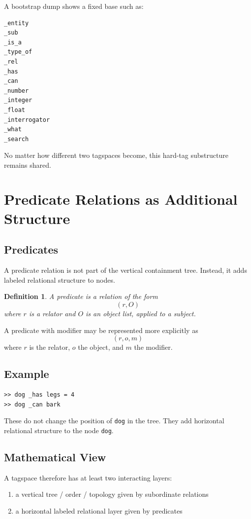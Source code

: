 \documentclass{article}
\newtheorem{definition}{Definition}[section]
\begin{document}
A bootstrap dump shows a fixed base such as:

\begin{verbatim}
_entity
_sub
_is_a
_type_of
_rel
_has
_can
_number
_integer
_float
_interrogator
_what
_search
\end{verbatim}

No matter how different two tagspaces become, this hard-tag substructure
remains shared.

\section{Predicate Relations as Additional Structure}

\subsection{Predicates}

A predicate relation is not part of the vertical containment tree.
Instead, it adds labeled relational structure to nodes.

\begin{definition}
A predicate is a relation of the form
\[
(r, O)
\]
where $r$ is a relator and $O$ is an object list, applied to a subject.
\end{definition}

A predicate with modifier may be represented more explicitly as
\[
(r, o, m)
\]
where $r$ is the relator, $o$ the object, and $m$ the modifier.

\subsection{Example}

\begin{verbatim}
>> dog _has legs = 4
>> dog _can bark
\end{verbatim}

These do not change the position of \texttt{dog} in the tree.
They add horizontal relational structure to the node \texttt{dog}.

\subsection{Mathematical View}

A tagspace therefore has at least two interacting layers:

\begin{enumerate}[label=\arabic*.]
    \item a vertical tree / order / topology given by subordinate relations
    \item a horizontal labeled relational layer given by predicates
\end{enumerate}
\end{document}
